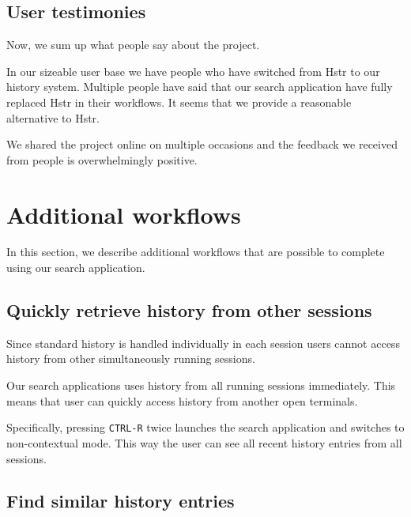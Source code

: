

\subsection{User testimonies}

Now, we sum up what people say about the project. 

In our sizeable user base we have people who have switched from Hstr to our history system. Multiple people have said that our search application have fully replaced Hstr in their workflows. It seems that we provide a reasonable alternative to Hstr.

We shared the project online on multiple occasions and the feedback we received from people is overwhelmingly positive.\cite{resh-feedback}

\section{Additional workflows}

In this section, we describe additional workflows that are possible to complete using our search application. 

\subsection{Quickly retrieve history from other sessions}

Since standard history is handled individually in each session users cannot access history from other simultaneously running sessions. 

Our search applications uses history from all running sessions immediately. This means that user can quickly access history from another open terminals. 

Specifically, pressing \verb|CTRL-R| twice launches the search application and switches to non-contextual mode. This way the user can see all recent history entries from all sessions.

\subsection{Find similar history entries}

